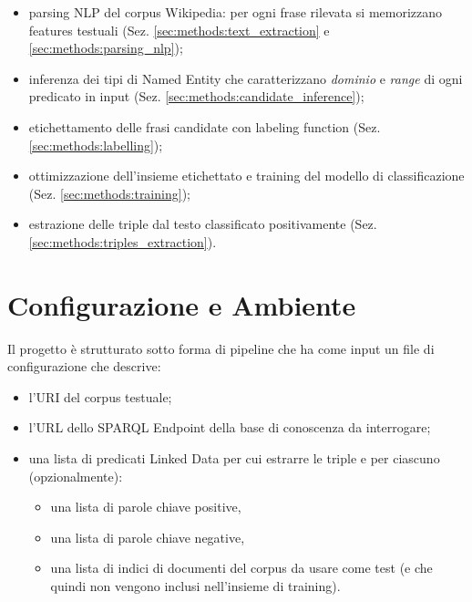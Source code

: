 \begin{itemize}

\item parsing NLP del corpus Wikipedia: per ogni frase rilevata si memorizzano features testuali (Sez. \ref{sec:methods:text_extraction} e \ref{sec:methods:parsing_nlp});

\item inferenza dei tipi di Named Entity che caratterizzano \textit{dominio} e \textit{range} di ogni predicato in input (Sez. \ref{sec:methods:candidate_inference});

\item etichettamento delle frasi candidate con labeling function  (Sez. \ref{sec:methods:labelling});

\item ottimizzazione dell'insieme etichettato e training del modello di classificazione (Sez. \ref{sec:methods:training});

\item estrazione delle triple dal testo classificato positivamente (Sez. \ref{sec:methods:triples_extraction}).
\end{itemize} 















\section{Configurazione e Ambiente}
\label{sec:methods:config}
Il progetto è strutturato sotto forma di pipeline che ha come input un file di configurazione che descrive:
\begin{itemize}
\item l'URI del corpus testuale;
\item l'URL dello SPARQL Endpoint della base di conoscenza da interrogare;
\item una lista di predicati Linked Data per cui estrarre le triple e per ciascuno (opzionalmente):
\begin{itemize}
\item una lista di parole chiave positive,
\item una lista di parole chiave negative,
\item una lista di indici di documenti del corpus da usare come test (e che quindi non vengono inclusi nell'insieme di training).
\end{itemize}
\end{itemize}

